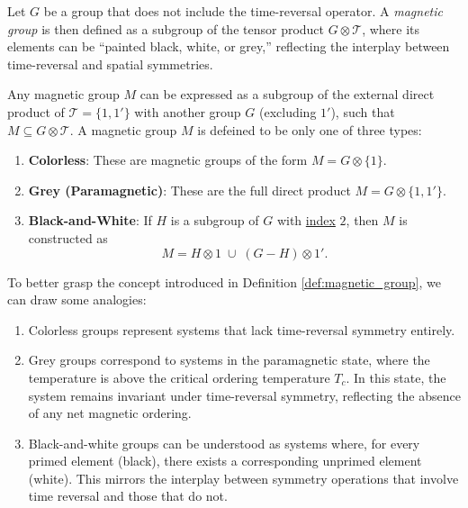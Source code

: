 Let \(G\) be a group that does not include the time-reversal operator. A \textit{magnetic group} is then defined as a subgroup of the tensor product \(G \otimes \mathcal{T}\), where its elements can be ``painted black, white, or grey,'' reflecting the interplay between time-reversal and spatial symmetries.

\begin{definition} \label{def:magnetic_group}
Any magnetic group \( M \) can be expressed as a subgroup of the external direct product of \( \mathcal{T} = \{1, 1'\}\) with another group \( G \) (excluding \( 1' \)), such that \( M \subseteq G \otimes \mathcal{T} \). A magnetic group $M$ is defeined to be only one of three types:
\begin{enumerate}
\item \textbf{Colorless}: These are magnetic groups of the form \(M =  G \otimes \{1\} \).

\item \textbf{Grey (Paramagnetic)}: These are the full direct product \(M = G \otimes \{1, 1'\} \).

\item \textbf{Black-and-White}: If \( H \) is a subgroup of \( G \) with \hyperref[def:left_cosets]{index} \(2\), then \( M \) is constructed as
\begin{equation} \label{eq:magnetic_black_white_def}
M = H \otimes 1 \; \cup \; (G - H) \otimes 1'.
\end{equation}
\end{enumerate}
\end{definition}

To better grasp the concept introduced in Definition \ref{def:magnetic_group}, we can draw some analogies:
\begin{enumerate}
\item Colorless groups represent systems that lack time-reversal symmetry entirely.

\item Grey groups correspond to systems in the paramagnetic state, where the temperature is above the critical ordering temperature \( T_c \). In this state, the system remains invariant under time-reversal symmetry, reflecting the absence of any net magnetic ordering.

\item Black-and-white groups can be understood as systems where, for every primed element (black), there exists a corresponding unprimed element (white). This mirrors the interplay between symmetry operations that involve time reversal and those that do not.
\end{enumerate}

